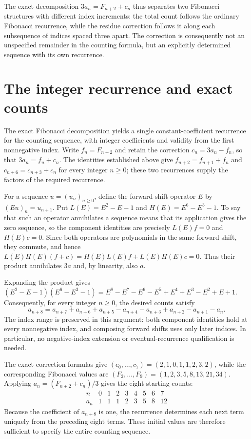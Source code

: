 \documentclass[11pt]{article}
\begin{document}
The exact decomposition $3a_n=F_{n+2}+c_n$ thus separates two Fibonacci structures with different index increments: the total count follows the ordinary Fibonacci recurrence, while the residue correction follows it along each subsequence of indices spaced three apart. The correction is consequently not an unspecified remainder in the counting formula, but an explicitly determined sequence with its own recurrence.

\section{The integer recurrence and exact counts}
The exact Fibonacci decomposition yields a single constant-coefficient recurrence for the counting sequence, with integer coefficients and validity from the first nonnegative index. Write $f_n=F_{n+2}$ and retain the correction $c_n=3a_n-f_n$, so that $3a_n=f_n+c_n$. The identities established above give $f_{n+2}=f_{n+1}+f_n$ and $c_{n+6}=c_{n+3}+c_n$ for every integer $n\geq 0$; these two recurrences supply the factors of the required recurrence.

For a sequence $u=(u_n)_{n\geq 0}$, define the forward-shift operator $E$ by $(Eu)_n=u_{n+1}$. Put $L(E)=E^2-E-1$ and $H(E)=E^6-E^3-1$. To say that such an operator annihilates a sequence means that its application gives the zero sequence, so the component identities are precisely $L(E)f=0$ and $H(E)c=0$. Since both operators are polynomials in the same forward shift, they commute, and hence
$L(E)H(E)(f+c)=H(E)L(E)f+L(E)H(E)c=0.$
Thus their product annihilates $3a$ and, by linearity, also $a$.

Expanding the product gives
$(E^2-E-1)(E^6-E^3-1)=E^8-E^7-E^6-E^5+E^4+E^3-E^2+E+1.$
Consequently, for every integer $n\geq 0$, the desired counts satisfy
\[a_{n+8}=a_{n+7}+a_{n+6}+a_{n+5}-a_{n+4}-a_{n+3}+a_{n+2}-a_{n+1}-a_n.\]
The index range is preserved in this argument: both component identities hold at every nonnegative index, and composing forward shifts uses only later indices. In particular, no negative-index extension or eventual-recurrence qualification is needed.

The exact correction formulas give $(c_0,\ldots,c_7)=(2,1,0,1,1,2,3,2)$, while the corresponding Fibonacci values are $(F_2,\ldots,F_9)=(1,2,3,5,8,13,21,34)$. Applying $a_n=(F_{n+2}+c_n)/3$ gives the eight starting counts:
\[\begin{array}{c|rrrrrrrr} n&0&1&2&3&4&5&6&7\\ \hline a_n&1&1&1&2&3&5&8&12 \end{array}\]
Because the coefficient of $a_{n+8}$ is one, the recurrence determines each next term uniquely from the preceding eight terms. These initial values are therefore sufficient to specify the entire counting sequence.
\end{document}
